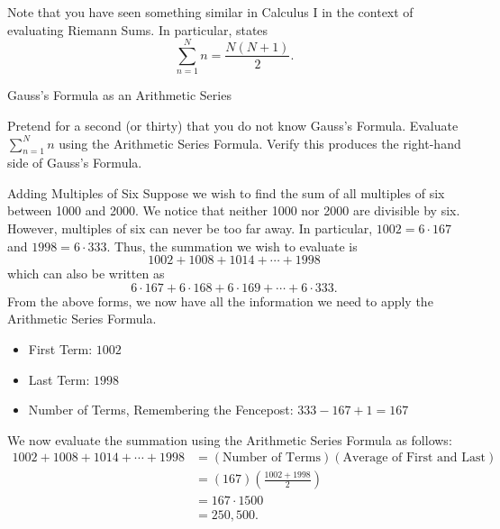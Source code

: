 Note that you have seen something similar in Calculus I in the context of evaluating Riemann Sums.  In particular,  states $$ \sum_{n=1}^Nn=\frac{N\left(N+1\right)}{2}.$$

\begin{exercise}{Gauss's Formula as an Arithmetic Series \Coffeecup \Coffeecup}

Pretend for a second (or thirty) that you do not know Gauss's Formula.  Evaluate $\sum_{n=1}^Nn$ using the Arithmetic Series Formula.  Verify this produces the right-hand side of Gauss's Formula.  
\end{exercise}

\begin{example}{Adding Multiples of Six }
Suppose we wish to find the sum of all multiples of six between 1000 and 2000.  We notice that neither 1000 nor 2000 are divisible by six. However, multiples of six can never be too far away.  In particular, $1002=6\cdot167$ and $1998=6\cdot 333$.  Thus, the summation we wish to evaluate is $$1002+1008+1014+\cdots+1998 $$ which can also be written as $$6\cdot167+6\cdot168+6\cdot169+\cdots+6\cdot333. $$  From the above forms, we now have all the information we need to apply the Arithmetic Series Formula.
\begin{itemize}
\item First Term: $1002$
\item Last Term: $1998$
\item Number of Terms, Remembering the Fencepost: $333-167+1=167$
\end{itemize}
We now evaluate the summation using the Arithmetic Series Formula as follows: \begin{align*}
1002+1008+1014+\cdots+1998 &=\left(\text{Number of Terms}\right)\left(\text{Average of First and Last}\right)\\ 
&=\left(167\right)\left(\frac{1002+1998}{2}\right)\\
&=167\cdot 1500 \\
&=250,500.
\end{align*}
\end{example}

